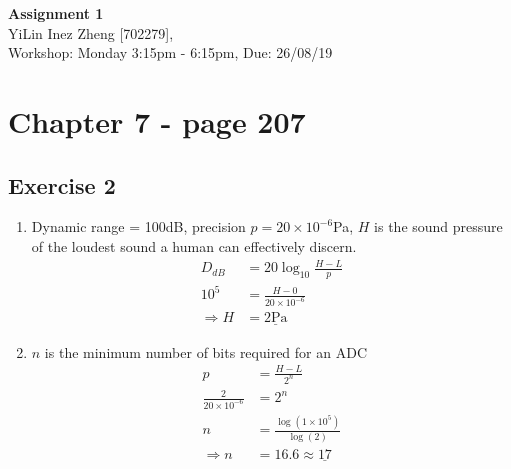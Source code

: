 \documentclass[11pt]{article}
\begin{document}

\clearpage
\setcounter{page}{1}

\begin{center}
\textbf{\Large{Assignment 1}}\\
YiLin Inez Zheng [702279], \\
Workshop: Monday 3:15pm - 6:15pm, Due: 26/08/19  
\end{center}

\section*{Chapter 7 - page 207}
\subsection*{Exercise 2}
\begin{enumerate}[label=\alph*)]
    \item %
    Dynamic range = 100dB, precision $p = 20 \times 10^{-6}$Pa, $H$ is the sound pressure of the loudest sound a human can effectively discern.
    \begin{align*}
        D_{dB} &= 20\log_{10}\frac{H - L}{p}\\
        10^5 &= \frac{H-0}{20 \times 10^{-6}}\\
        \Rightarrow H &= \underline{2 \text{Pa}}
    \end{align*}
    \item %
    $n$ is the minimum number of bits required for an ADC
    \begin{align*}
        p &= \frac{H - L}{2^n}\\
        \frac{2}{20 \times 10^{-6}} &= 2^n\\
        n &= \frac{\log(1\times 10^{5})}{\log(2)}\\
        \Rightarrow n &= 16.6 \approx \underline{17}
    \end{align*}
\end{enumerate}
\end{document}
